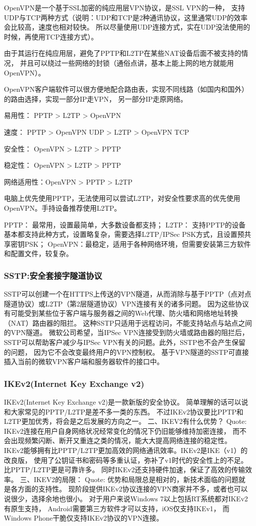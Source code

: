 \documentclass{book}
\begin{document}
OpenVPN是一个基于SSL加密的纯应用层VPN协议，是SSL VPN的一种，
支持UDP与TCP两种方式（说明：UDP和TCP是2种通讯协议，这里通常UDP的效率会比较高，速度也相对较快。
所以尽量使用UDP连接方式，实在UDP没法使用的时候，再使用TCP连接方式）。

由于其运行在纯应用层，避免了PPTP和L2TP在某些NAT设备后面不被支持的情况，
并且可以绕过一些网络的封锁（通俗点讲，基本上能上网的地方就能用OpenVPN）。

OpenVPN客户端软件可以很方便地配合路由表，实现不同线路（如国内和国外）的路由选择，实现一部分IP走VPN，
另一部分IP走原网络。


易用性：    PPTP > L2TP > OpenVPN

速度：      PPTP > OpenVPN UDP > L2TP > OpenVPN TCP

安全性：    OpenVPN > L2TP > PPTP

稳定性：    OpenVPN > L2TP > PPTP

网络适用性：OpenVPN > PPTP > L2TP

电脑上优先使用PPTP，无法使用可以尝试L2TP，对安全性要求高的优先使用OpenVPN。手持设备推荐使用L2TP。

PPTP：      最常用，设置最简单，大多数设备都支持；
L2TP：      支持PPTP的设备基本都支持此种方式，设置略复杂，需要选择L2TP/IPSec PSK方式，且设置预共享密钥PSK；
OpenVPN：最稳定，适用于各种网络环境，但需要安装第三方软件和配置文件，较复杂。

\subsubsection{SSTP:安全套接字隧道协议}

SSTP可以创建一个在HTTPS上传送的VPN隧道，从而消除与基于PPTP（点对点隧道协议）或L2TP（第2层隧道协议）VPN连接有关的诸多问题。
因为这些协议有可能受到某些位于客户端与服务器之间的Web代理、防火墙和网络地址转换（NAT）路由器的阻拦。
这种SSTP只适用于远程访问，不能支持站点与站点之间的VPN隧道。
微软公司希望，当IPSec VPN连接受到防火墙或路由器的阻拦后，
SSTP可以帮助客户减少与IPSec VPN有关的问题。此外，SSTP也不会产生保留的问题，
因为它不会改变最终用户的VPN控制权。
基于VPN隧道的SSTP可直接插入当前的微软VPN客户端和服务器软件的接口中。

\subsubsection{IKEv2(Internet Key Exchange v2)}

IKEv2(Internet Key Exchange v2)是一款新版的安全协议。
简单理解的话可以说和大家常见的PPTP/L2TP是差不多一类的东西。
不过IKEv2协议要比PPTP和L2TP更加优秀，将会是之后发展的方向之一。
二、IKEV2有什么优势？
Quote:
IKEv2连接在用户自身网络状况经常变化的情况下仍旧能够维持加密连接，
而不会出现频繁闪断、断开又重连之类的情况，能大大提高网络连接的稳定性。
IKEv2能够拥有比PPTP/L2TP更加高效的网络通讯效率。IKEv2是IKE（v1）的改良版，
使用了公钥证书和密码等多重认证，弥补了v1时代的安全性上的不足。比PPTP/L2TP更是可靠许多。
同时IKEv2还支持硬件加速，保证了高效的传输效率。
三、IKEV2的局限：
Quote:
优势和局限总是相对的，新技术面临的问题就是各方面的支持性。
现阶段提供IKEv2协议连接的VPN商家并不多，或者也可以说很少，选择余地也很小。
对于用户来说Windows 7以上包括RT系统都对IKEv2有原生支持，
Android需要第三方软件才可以支持，iOS仅支持IKEv1，
而Windows Phone干脆仅支持IKEv2协议的VPN连接。
\end{document}
